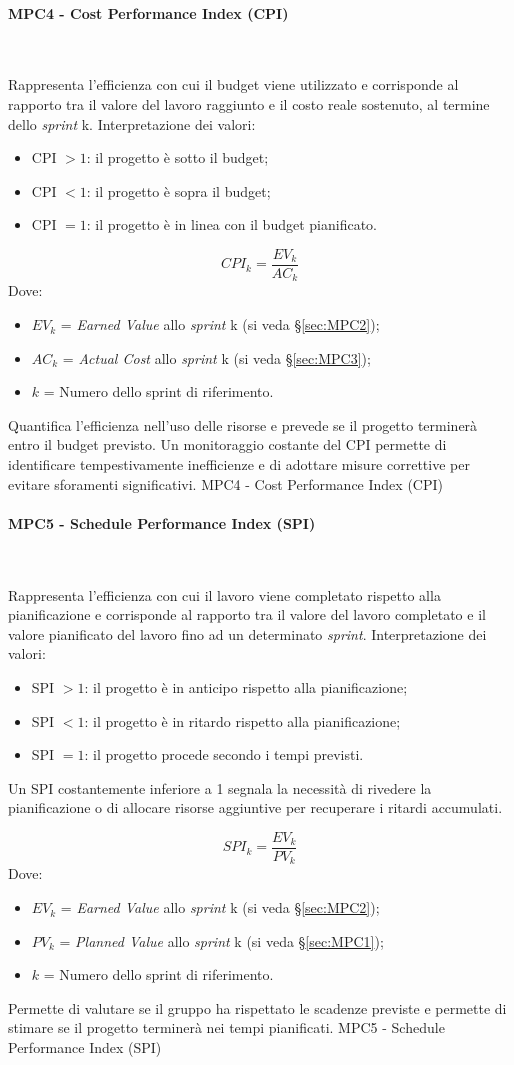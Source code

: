 \documentclass[10pt, letterpaper]{article}
\newcommand{\trisubsection}[1]{\paragraph{#1}\mbox{}\\}
\begin{document}
\trisubsection{MPC4 - Cost Performance Index (CPI)}
\label{sec:MPC4}
{Rappresenta l'efficienza con cui il budget viene utilizzato e corrisponde al
    rapporto tra il valore del lavoro raggiunto e il costo reale sostenuto, al termine dello \textit{sprint} k.
    Interpretazione dei valori:
    \begin{itemize}
        \item CPI $> 1$: il progetto è sotto il budget;
        \item CPI $< 1$: il progetto è sopra il budget;
        \item CPI $= 1$: il progetto è in linea con il budget pianificato.
    \end{itemize}}
{\[ CPI_k = \frac{EV_k}{AC_k} \]
    Dove:
    \begin{itemize}
        \item $EV_k$ = \textit{Earned Value} allo \textit{sprint} k (si veda §\ref{sec:MPC2});
        \item $AC_k$ = \textit{Actual Cost} allo \textit{sprint} k (si veda §\ref{sec:MPC3});
        \item $k$ = Numero dello sprint di riferimento.
    \end{itemize}
}
{Quantifica l'efficienza nell'uso delle risorse e
    prevede se il progetto terminerà entro il budget previsto. Un monitoraggio
    costante del CPI permette di identificare tempestivamente inefficienze e di
    adottare misure correttive per evitare sforamenti significativi.}
{MPC4 - Cost Performance Index (CPI)}

\trisubsection{MPC5 - Schedule Performance Index (SPI)}
\label{sec:MPC5}
{Rappresenta l'efficienza con cui il lavoro viene completato rispetto alla
    pianificazione e corrisponde al rapporto tra il valore del lavoro completato
    e il valore pianificato del lavoro fino ad un determinato \textit{sprint}.
    Interpretazione dei valori:
    \begin{itemize}
        \item SPI $> 1$: il progetto è in anticipo rispetto alla pianificazione;
        \item SPI $< 1$: il progetto è in ritardo rispetto alla pianificazione;
        \item SPI $= 1$: il progetto procede secondo i tempi previsti.
    \end{itemize}
    Un SPI costantemente inferiore a 1 segnala la necessità di rivedere
    la pianificazione o di allocare risorse aggiuntive per recuperare i
    ritardi accumulati.}
{ \[ SPI_k = \frac{EV_k}{PV_k} \]
    Dove:
    \begin{itemize}
        \item $EV_k$ = \textit{Earned Value} allo \textit{sprint} k (si veda §\ref{sec:MPC2});
        \item $PV_k$ = \textit{Planned Value} allo \textit{sprint} k (si veda §\ref{sec:MPC1});
        \item $k$ = Numero dello sprint di riferimento.
    \end{itemize} }
{Permette di valutare se il gruppo ha rispettato le
    scadenze previste e permette di stimare se il progetto terminerà
    nei tempi pianificati.}
{MPC5 - Schedule Performance Index (SPI)}
\end{document}
